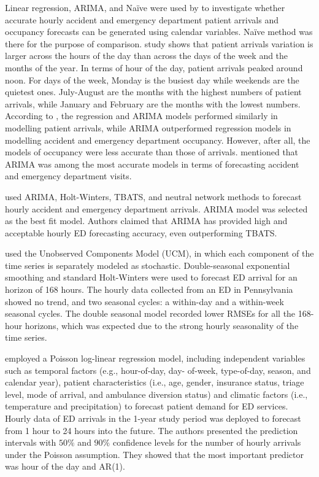 \documentclass[]{elsarticle} %
\begin{document}
Linear regression, ARIMA, and Naïve were used by \citet{hertzum2017forecasting} to investigate whether accurate hourly accident and emergency department patient arrivals and occupancy forecasts can be generated using calendar variables. Naïve method was there for the purpose of comparison. \citet{hertzum2017forecasting} study shows that patient arrivals variation is larger across the hours of the day than across the days of the week and the months of the year. In terms of hour of the day, patient arrivals peaked around noon. For days of the week, Monday is the busiest day while weekends are the quietest ones. July-August are the months with the highest numbers of patient arrivals, while January and February are the months with the lowest numbers. According to \citet{hertzum2017forecasting}, the regression and ARIMA models performed similarly in modelling patient arrivals, while ARIMA outperformed regression models in modelling accident and emergency department occupancy. However, after all, the models of occupancy were less accurate than those of arrivals. \citet{hertzum2017forecasting} mentioned that ARIMA was among the most accurate models in terms of forecasting accident and emergency department visits.

\citet{choudhury2020forecasting} used ARIMA, Holt-Winters, TBATS, and neutral network methods to forecast hourly accident and emergency department arrivals. ARIMA model was selected as the best fit model. Authors claimed that ARIMA has provided high and acceptable hourly ED forecasting accuracy, even outperforming TBATS.

\citet{morzuch2006forecasting} used the Unobserved Components Model (UCM), in which each component of the time series is separately modeled as stochastic. Double-seasonal exponential smoothing and standard Holt-Winters were used to forecast ED arrival for an horizon of 168 hours. The hourly data collected from an ED in Pennsylvania showed no trend, and two seasonal cycles: a within-day and a within-week seasonal cycles. The double seasonal model recorded lower RMSEs for all the 168-hour horizons, which was expected due to the strong hourly seasonality of the time series.

\citet{mccarthy2008challenge} employed a Poisson log-linear regression model, including independent variables such as temporal factors (e.g., hour-of-day, day- of-week, type-of-day, season, and calendar year), patient characteristics (i.e., age, gender, insurance status, triage level, mode of arrival, and ambulance diversion status) and climatic factors (i.e., temperature and precipitation) to forecast patient demand for ED services. Hourly data of ED arrivals in the 1-year study period was deployed to forecast from 1 hour to 24 hours into the future. The authors presented the prediction intervals with \(50\%\) and \(90\%\) confidence levels for the number of hourly arrivals under the Poisson assumption. They showed that the most important predictor was hour of the day and AR(1).
\end{document}
